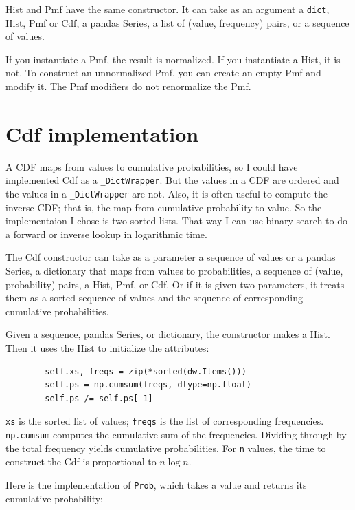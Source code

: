 \documentclass[12pt]{book}
\begin{document}
Hist and Pmf have the same constructor.  It can take
as an argument a \verb"dict", Hist, Pmf or Cdf, a pandas
Series, a list of (value, frequency) pairs, or a sequence of values.

If you instantiate a Pmf, the result is normalized.  If you
instantiate a Hist, it is not.  To construct an unnormalized Pmf,
you can create an empty Pmf and modify it.  The Pmf modifiers do
not renormalize the Pmf.


\section{Cdf implementation}

A CDF maps from values to cumulative probabilities, so I could have
implemented Cdf as a \verb"_DictWrapper".  But the values in a CDF are
ordered and the values in a \verb"_DictWrapper" are not.  Also, it is
often useful to compute the inverse CDF; that is, the map from
cumulative probability to value.  So the implementaion I chose is two
sorted lists.  That way I can use binary search to do a forward or
inverse lookup in logarithmic time.

The Cdf constructor can take as a parameter a sequence of values
or a pandas Series, a dictionary that maps from values to
probabilities, a sequence of (value, probability) pairs, a Hist, Pmf,
or Cdf.  Or if it is given two parameters, it treats them as a sorted
sequence of values and the sequence of corresponding cumulative
probabilities.

Given a sequence, pandas Series, or dictionary, the constructor makes
a Hist.  Then it uses the Hist to initialize the attributes:

\begin{verbatim}
        self.xs, freqs = zip(*sorted(dw.Items()))
        self.ps = np.cumsum(freqs, dtype=np.float)
        self.ps /= self.ps[-1]
\end{verbatim}

\verb"xs" is the sorted list of values; \verb"freqs" is the list
of corresponding frequencies.  \verb"np.cumsum" computes
the cumulative sum of the frequencies.  Dividing through by the
total frequency yields cumulative probabilities.
For \verb"n" values, the time to construct the
Cdf is proportional to $n \log n$.

Here is the implementation of \verb"Prob", which takes a value
and returns its cumulative probability: 
\end{document}

